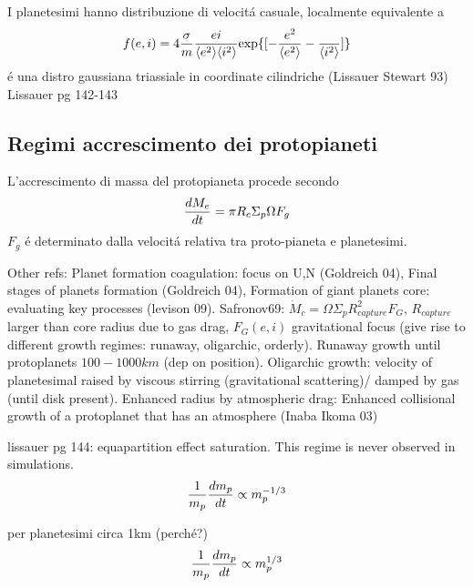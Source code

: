 \begin{workout}
\begin{workout}
I planetesimi hanno distribuzione di velocit\'a casuale, localmente equivalente a
\begin{equation}
f(e,i)=4\frac{\sigma}{m}\frac{ei}{\exv{e^2}\exv{i^2}}\Exp{[-\frac{e^2}{\exv{e^2}}-\frac{}{\exv{i^2}}]}
\end{equation}
\'e una distro gaussiana triassiale in coordinate cilindriche (Lissauer Stewart 93)
Lissauer pg 142-143
\end{workout}

\subsection{Regimi accrescimento dei protopianeti}

L'accrescimento di massa del protopianeta procede secondo
\begin{equation}
\TDy{t}{M_e}=\pi R_c\Sigma_p\Omega F_g
\end{equation}
$F_g$ \'e determinato dalla velocit\'a relativa tra proto-pianeta e planetesimi.

\begin{workout}
Other refs: Planet formation coagulation: focus on U,N (Goldreich 04), Final stages of planets formation (Goldreich 04), Formation of giant planets core: evaluating key processes (levison 09).
Safronov69: $\dot{M}_c=\Omega\Sigma_pR^2_{capture}F_G$, $R_{capture}$ larger than core radius due to gas drag, $F_G(e,i)$ gravitational focus (give rise to different growth regimes: runaway, oligarchic, orderly).
Runaway growth until protoplanets $100-1000km$ (dep on position).
Oligarchic growth: velocity of planetesimal raised by viscous stirring (gravitational scattering)/ damped by gas (until disk present).
Enhanced radius by atmospheric drag: Enhanced collisional growth of a protoplanet that has an atmosphere (Inaba Ikoma 03)
\end{workout}

\begin{workout}
lissauer pg 144: equapartition effect saturation. This regime is never observed in simulations.
\begin{equation}
\frac{1}{m_p}\TDy{t}{m_p}\propto m_p\expy{-1/3}
\end{equation}
\end{workout}

\begin{workout}
per planetesimi circa 1km (perch\'e?)
\begin{equation}
\frac{1}{m_p}\TDy{t}{m_p}\propto m_p\expy{1/3}
\end{equation}
\end{workout}


\end{workout}
